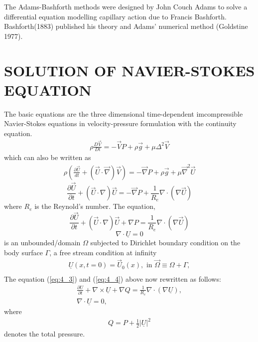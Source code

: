 \documentclass[11pt]{report}
\newcommand{\sps}{\\[0.2cm]}
\newcommand{\refn}[1]{(\ref{#1})}
\newcommand{\refx}[1]{\refn{eq:#1}}
\newcommand{\NI}{\noindent}
\begin{document}
	\NI The Adams-Bashforth methods were designed by John Couch Adams to solve a differential equation modelling capillary action due to Francis Bashforth. Bashforth(1883) published his theory and Adams' numerical method (Goldstine 1977).
	
	
	\chapter{SOLUTION OF NAVIER-STOKES EQUATION}
	The basic equations are the three dimensional time-dependent imcompressible Navier-Stokes equations in velocity-pressure formulation with the continuity equation.
	\begin{eqnarray}
		\rho\frac{D\vec{V}}{Dt} = -\vec{V} P + \rho\vec{g} + \mu \Delta^2\vec{V}
	\end{eqnarray}
	which can also be written as
	\begin{eqnarray}
		\rho\left(\frac{\partial \vec{U}}{dt} + (\vec{U}\cdot \vec{\nabla})\vec{V}\right) = -\vec{\nabla}P + \rho\vec{g} + \mu\vec{\nabla}^2\vec{U}
	\end{eqnarray}
	\begin{equation*}
		\frac{\partial\vec{U}}{\partial t} + (\vec{U}\cdot\nabla)\vec{U} = -\vec{\nabla}P + \frac{1}{R_e} \nabla \cdot (\nabla\vec{U})
	\end{equation*}
	where $R_e$ is the Reynold's number. The equation,
	\begin{equation}
		\frac{\partial \vec{U}}{\partial t} + (\vec{U}\cdot\nabla)\vec{U} + \nabla P = \frac{1}{R_e}\nabla\cdot(\nabla\vec{U})\label{eq:4_3}
	\end{equation}
	\begin{equation}
		\nabla \cdot \underline{U} = 0\label{eq:4_4}
	\end{equation}
	is an unbounded/domain $\Omega$ subjected to Dirichlet boundary condition on the body surface $\Gamma$, a free stream condition at infinity
	\begin{eqnarray*}
		\underline{U}(x,t=0) = \vec{U}_0(x), \text{ in } \vec{\Omega} \equiv \Omega + \Gamma,\sps
	\end{eqnarray*}
	The equation \refx{4_3} and \refx{4_4} above now rewritten as follows:
	\begin{gather}
		\frac{\partial U}{\partial t} + \nabla\times\underline{U} + \nabla Q = \frac{1}{R_e}\nabla \cdot (\nabla\underline{U}),\label{eq:4_5}\sps
		\nabla\cdot\underline{U} = 0,\label{eq:4_6}
	\end{gather}
	where 
	\begin{eqnarray*}
		Q = P + \frac{1}{2}\Bigg|\underline{U}\Bigg|^2
	\end{eqnarray*}
	denotes the total pressure.\\
	
\end{document}
